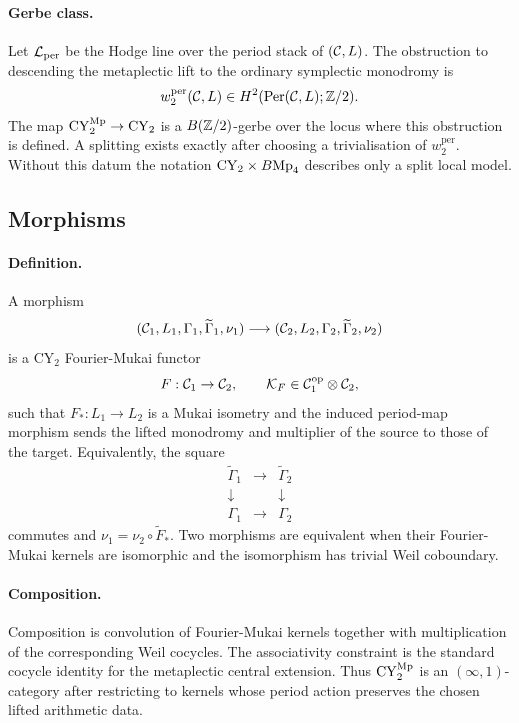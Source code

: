\paragraph{Gerbe class.}
Let \(\mathcal{L}_{\mathrm{per}}\) be the Hodge line over the period stack of
\((\mathcal{C},L)\).  The obstruction to descending the metaplectic lift to the
ordinary symplectic monodromy is
\[
  w_2^{\mathrm{per}}(\mathcal{C},L)\in
  H^2(\mathrm{Per}(\mathcal{C},L);\mathbb{Z}/2).
\]
The map \(\mathrm{CY}_2^{\mathrm{Mp}}\to\mathrm{CY}_2\) is a \(B(\mathbb{Z}/2)\)-gerbe over the locus where
this obstruction is defined.  A splitting exists exactly after choosing
a trivialisation of \(w_2^{\mathrm{per}}\).  Without this datum the
notation \(\mathrm{CY}_2\times B\mathrm{Mp}_4\) describes only a split local model.

\subsection*{Morphisms}

\paragraph{Definition.}
A morphism
\[
  (\mathcal{C}_1,L_1,\Gamma_1,\widetilde{\Gamma}_1,\nu_1)
  \longrightarrow
  (\mathcal{C}_2,L_2,\Gamma_2,\widetilde{\Gamma}_2,\nu_2)
\]
is a CY\(_2\) Fourier-Mukai functor
\[
  F:\mathcal{C}_1\to\mathcal{C}_2,\qquad
  \mathcal{K}_F\in\mathcal{C}_1^{\mathrm{op}}\otimes\mathcal{C}_2,
\]
such that \(F_\ast:L_1\to L_2\) is a Mukai isometry and the induced
period-map morphism sends the lifted monodromy and multiplier of the
source to those of the target.  Equivalently, the square
\[
\begin{array}{ccc}
\widetilde{\Gamma}_1 & \longrightarrow & \widetilde{\Gamma}_2\\
\downarrow && \downarrow\\
\Gamma_1 & \longrightarrow & \Gamma_2
\end{array}
\]
commutes and \(\nu_1=\nu_2\circ\widetilde{F}_\ast\).  Two morphisms are
equivalent when their Fourier-Mukai kernels are isomorphic and the
isomorphism has trivial Weil coboundary.

\paragraph{Composition.}
Composition is convolution of Fourier-Mukai kernels together with
multiplication of the corresponding Weil cocycles.  The associativity
constraint is the standard cocycle identity for the metaplectic central
extension.  Thus \(\mathrm{CY}_2^{\mathrm{Mp}}\) is an \((\infty,1)\)-category after restricting
to kernels whose period action preserves the chosen lifted arithmetic
data.


